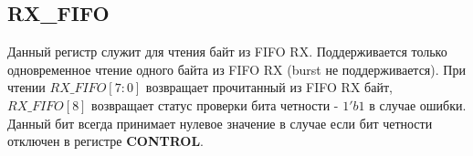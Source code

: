 \documentclass[a4paper,12pt]{article}
\begin{document}
\subsection{RX\_FIFO}

Данный регистр служит для чтения байт из FIFO RX. Поддерживается только одновременное чтение одного байта из FIFO RX (burst не поддерживается). При чтении $RX\_FIFO[7:0]$ возвращает прочитанный из FIFO RX байт, $RX\_FIFO[8]$ возвращает статус проверки бита четности - $1'b1$ в случае ошибки. Данный бит всегда принимает нулевое значение в случае если бит четности отключен в регистре \textbf{CONTROL}.
\end{document}
